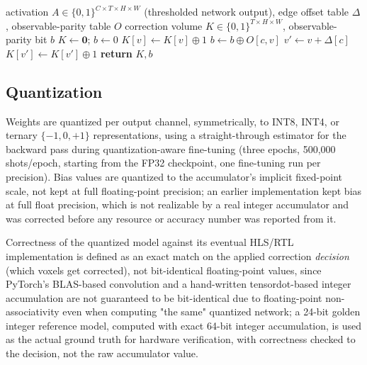 \documentclass[conference]{IEEEtran}
\begin{document}
\begin{algorithm}
\caption{Per-local-edge correction application}
\label{alg:edge-correction}
\begin{algorithmic}[1]
\Require activation $A \in \{0,1\}^{C \times T \times H \times W}$ (thresholded network output), edge offset table $\Delta$, observable-parity table $O$
\Ensure correction volume $K \in \{0,1\}^{T\times H\times W}$, observable-parity bit $b$
\State $K \gets \mathbf{0}$; $b \gets 0$
  \State $K[v] \gets K[v] \oplus 1$ 
  \State $b \gets b \oplus O[c,v]$ \label{line:obsparity} 
   
    \State $v' \gets v + \Delta[c]$
      \State $K[v'] \gets K[v'] \oplus 1$ 
    \EndIf
  \EndIf
\EndFor
\State \textbf{return} $K, b$
\end{algorithmic}
\end{algorithm}

\subsection{Quantization}
\label{subsec:arch-quant}

Weights are quantized per output channel, symmetrically, to INT8, INT4, or ternary \(\{-1,0,+1\}\) representations, using a straight-through estimator for the backward pass during quantization-aware fine-tuning (three epochs, 500{,}000 shots/epoch, starting from the FP32 checkpoint, one fine-tuning run per precision). Bias values are quantized to the accumulator's implicit fixed-point scale, not kept at full floating-point precision; an earlier implementation kept bias at full float precision, which is not realizable by a real integer accumulator and was corrected before any resource or accuracy number was reported from it.

Correctness of the quantized model against its eventual HLS/RTL implementation is defined as an exact match on the applied correction \emph{decision} (which voxels get corrected), not bit-identical floating-point values, since PyTorch's BLAS-based convolution and a hand-written tensordot-based integer accumulation are not guaranteed to be bit-identical due to floating-point non-associativity even when computing "the same" quantized network; a 24-bit golden integer reference model, computed with exact 64-bit integer accumulation, is used as the actual ground truth for hardware verification, with correctness checked to the decision, not the raw accumulator value.
\end{document}
